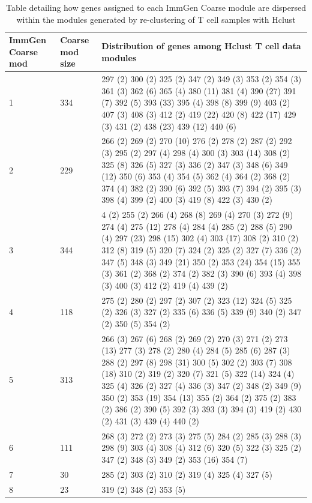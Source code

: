 \begin{landscape}
\small 
\begin{longtable}{|p{1.5cm}|p{1.25cm}|p{21cm}|}
\caption{Table detailing how genes assigned to each ImmGen Coarse module are dispersed within the modules generated by re-clustering of T cell samples with Hclust}\\
\hline
ImmGen Coarse mod & Coarse mod size & Distribution of genes among Hclust T cell data modules \\
\hline
1 & 334 & 297 (2) 300 (2) 325 (2) 347 (2) 349 (3) 353 (2) 354 (3) 361 (3) 362 (6) 365 (4) 380 (11) 381 (4) 390 (27) 391 (7) 392 (5) 393 (33) 395 (4) 398 (8) 399 (9) 403 (2) 407 (3) 408 (3) 412 (2) 419 (22) 420 (8) 422 (17) 429 (3) 431 (2) 438 (23) 439 (12) 440 (6) \\
2 & 229 & 266 (2) 269 (2) 270 (10) 276 (2) 278 (2) 287 (2) 292 (3) 295 (2) 297 (4) 298 (4) 300 (3) 303 (14) 308 (2) 325 (8) 326 (5) 327 (3) 336 (2) 347 (3) 348 (6) 349 (12) 350 (6) 353 (4) 354 (5) 362 (4) 364 (2) 368 (2) 374 (4) 382 (2) 390 (6) 392 (5) 393 (7) 394 (2) 395 (3) 398 (4) 399 (2) 400 (3) 419 (8) 422 (3) 430 (2) \\
3 & 344 & 4 (2) 255 (2) 266 (4) 268 (8) 269 (4) 270 (3) 272 (9) 274 (4) 275 (12) 278 (4) 284 (4) 285 (2) 288 (5) 290 (4) 297 (23) 298 (15) 302 (4) 303 (17) 308 (2) 310 (2) 312 (8) 319 (5) 320 (7) 324 (2) 325 (2) 327 (7) 336 (2) 347 (5) 348 (3) 349 (21) 350 (2) 353 (24) 354 (15) 355 (3) 361 (2) 368 (2) 374 (2) 382 (3) 390 (6) 393 (4) 398 (3) 400 (3) 412 (2) 419 (4) 439 (2) \\
4 & 118 & 275 (2) 280 (2) 297 (2) 307 (2) 323 (12) 324 (5) 325 (2) 326 (3) 327 (2) 335 (6) 336 (5) 339 (9) 340 (2) 347 (2) 350 (5) 354 (2) \\
5 & 313 & 266 (3) 267 (6) 268 (2) 269 (2) 270 (3) 271 (2) 273 (13) 277 (3) 278 (2) 280 (4) 284 (5) 285 (6) 287 (3) 288 (2) 297 (8) 298 (31) 300 (5) 302 (2) 303 (7) 308 (18) 310 (2) 319 (2) 320 (7) 321 (5) 322 (14) 324 (4) 325 (4) 326 (2) 327 (4) 336 (3) 347 (2) 348 (2) 349 (9) 350 (2) 353 (19) 354 (13) 355 (2) 364 (2) 375 (2) 383 (2) 386 (2) 390 (5) 392 (3) 393 (3) 394 (3) 419 (2) 430 (2) 431 (3) 439 (4) 440 (2) \\
6 & 111 & 268 (3) 272 (2) 273 (3) 275 (5) 284 (2) 285 (3) 288 (3) 298 (9) 303 (4) 308 (4) 312 (6) 320 (5) 322 (3) 325 (2) 347 (2) 348 (3) 349 (2) 353 (16) 354 (7) \\
7 & 30 & 285 (2) 303 (2) 310 (2) 319 (4) 325 (4) 327 (5) \\
8 & 23 & 319 (2) 348 (2) 353 (5) \\

\end{longtable}
\end{landscape}
